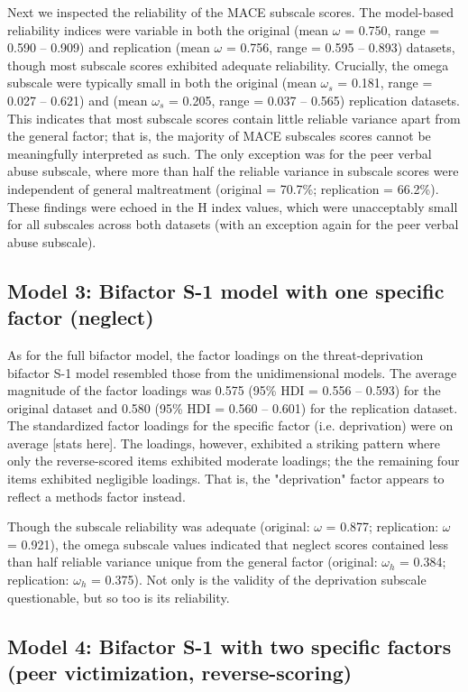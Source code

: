 \documentclass[letterpaper,man,natbib]{apa6}  %
\begin{document}
Next we inspected the reliability of the MACE subscale scores. The model-based reliability indices were variable in both the original (mean $\omega$ = 0.750, range = 0.590 -- 0.909) and replication (mean $\omega$ = 0.756, range = 0.595 -- 0.893) datasets, though most subscale scores exhibited adequate reliability. Crucially, the omega subscale were typically small in both the original (mean $\omega_s$ = 0.181, range = 0.027 -- 0.621) and (mean $\omega_s$ = 0.205, range = 0.037 -- 0.565) replication datasets. This indicates that most subscale scores contain little reliable variance apart from the general factor; that is, the majority of MACE subscales scores cannot be meaningfully interpreted as such. The only exception was for the peer verbal abuse subscale, where more than half the reliable variance in subscale scores were independent of general maltreatment (original = 70.7\%; replication = 66.2\%). These findings were echoed in the H index values, which were unacceptably small for all subscales across both datasets (with an exception again for the peer verbal abuse subscale).  

\subsection{Model 3: Bifactor S-1 model with one specific factor (neglect)}

As for the full bifactor model, the factor loadings on the threat-deprivation bifactor S-1 model resembled those from the unidimensional models. The average magnitude of the factor loadings was 0.575 (95\% HDI = 0.556 -- 0.593) for the original dataset and 0.580 (95\% HDI = 0.560 -- 0.601) for the replication dataset. The standardized factor loadings for the specific factor (i.e. deprivation) were on average [stats here]. The loadings, however, exhibited a striking pattern where only the reverse-scored items exhibited moderate loadings; the the remaining four items exhibited negligible loadings. That is, the "deprivation" factor appears to reflect a methods factor instead. 

Though the subscale reliability was adequate (original: $\omega$ = 0.877; replication: $\omega$ = 0.921), the omega subscale values indicated that neglect scores contained less than half reliable variance unique from the general factor (original: $\omega_h$ = 0.384; replication: $\omega_h$ = 0.375). Not only is the validity of the deprivation subscale questionable, but so too is its reliability.   

\subsection{Model 4: Bifactor S-1 with two specific factors (peer victimization, reverse-scoring)}
\end{document}
